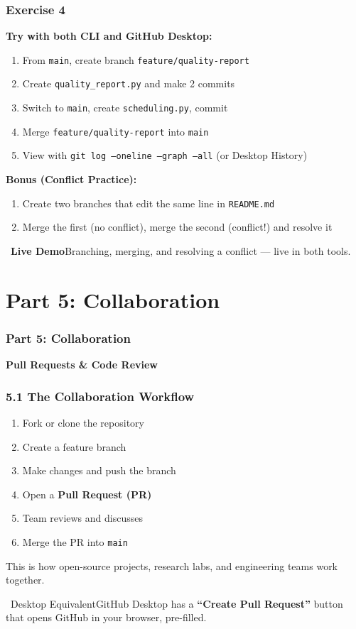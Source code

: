 \documentclass{beamer}
\newcommand{\livedemo}[1]{\begin{alertblock}{\faDesktop\ \textbf{Live Demo}}#1\end{alertblock}}
\newcommand{\desktoptip}[1]{\begin{block}{\faMousePointer\ Desktop Equivalent}#1\end{block}}
\begin{document}
\begin{frame}
\frametitle{Exercise 4}
\textbf{Try with both CLI and GitHub Desktop:}
\begin{enumerate}
    \item From \texttt{main}, create branch \texttt{feature/quality-report}
    \item Create \texttt{quality\_report.py} and make 2 commits
    \item Switch to \texttt{main}, create \texttt{scheduling.py}, commit
    \item Merge \texttt{feature/quality-report} into \texttt{main}
    \item View with \texttt{git log --oneline --graph --all} (or Desktop History)
\end{enumerate}
\vspace{2mm}
\textbf{Bonus (Conflict Practice):}
\begin{enumerate}
    \item Create two branches that edit the same line in \texttt{README.md}
    \item Merge the first (no conflict), merge the second (conflict!) and resolve it
\end{enumerate}
\livedemo{Branching, merging, and resolving a conflict --- live in both tools.}
\end{frame}

\section{Part 5: Collaboration}

\begin{frame}
\frametitle{Part 5: Collaboration}
\centering
\Large \textbf{Pull Requests \& Code Review}\\[6pt]
\end{frame}

\begin{frame}
\frametitle{5.1 The Collaboration Workflow}

\begin{enumerate}
    \item Fork or clone the repository
    \item Create a feature branch
    \item Make changes and push the branch
    \item Open a \textbf{Pull Request (PR)}
    \item Team reviews and discusses
    \item Merge the PR into \texttt{main}
\end{enumerate}

\vspace{4mm}
This is how open-source projects, research labs, and engineering teams work together.

\desktoptip{GitHub Desktop has a \textbf{``Create Pull Request''} button that opens GitHub in your browser, pre-filled.}
\end{frame}
\end{document}
